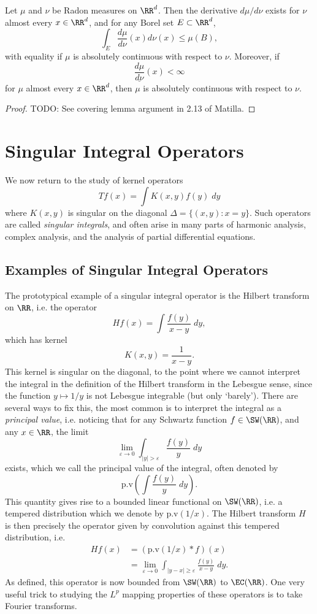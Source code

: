 \begin{theorem}
    Let $\mu$ and $\nu$ be Radon measures on $\RR^d$. Then the derivative $d\mu / d\nu$ exists for $\nu$ almost every $x \in \RR^d$, and for any Borel set $E \subset \RR^d$,
    \[ \int_E \frac{d\mu}{d\nu}(x) d\nu(x) \leq \mu(B), \]
    with equality if $\mu$ is absolutely continuous with respect to $\nu$. Moreover, if
    \[ \underline{\frac{d\mu}{d\nu}}(x) < \infty \]
    for $\mu$ almost every $x \in \RR^d$, then $\mu$ is absolutely continuous with respect to $\nu$.
\end{theorem}
\begin{proof}
    TODO: See covering lemma argument in 2.13 of Matilla.
\end{proof}




\chapter{Singular Integral Operators}

We now return to the study of kernel operators
%
\[ Tf(x) = \int K(x,y) f(y)\; dy \]
%
where $K(x,y)$ is singular on the diagonal $\Delta = \{ (x,y) : x = y \}$. Such operators are called \emph{singular integrals}, and often arise in many parts of harmonic analysis, complex analysis, and the analysis of partial differential equations.

\section{Examples of Singular Integral Operators}

The prototypical example of a singular integral operator is the Hilbert transform on $\RR$, i.e. the operator
%
\[ Hf(x) = \int \frac{f(y)}{x - y}\; dy, \]
%
which has kernel
%
\[ K(x,y) = \frac{1}{x - y}. \]
%
This kernel is singular on the diagonal, to the point where we cannot interpret the integral in the definition of the Hilbert transform in the Lebesgue sense, since the function $y \mapsto 1/y$ is not Lebesgue integrable (but only `barely'). There are several ways to fix this, the most common is to interpret the integral as a \emph{principal value}, i.e. noticing that for any Schwartz function $f \in \SW(\RR)$, and any $x \in \RR$, the limit
%
\[ \lim_{\varepsilon \to 0} \int_{|y| > \varepsilon} \frac{f(y)}{y}\; dy \]
%
exists, which we call the principal value of the integral, often denoted by
%
\[ \text{p.v} \left( \int \frac{f(y)}{y}\; dy \right). \]
%
This quantity gives rise to a bounded linear functional on $\SW(\RR)$, i.e. a tempered distribution which we denote by $\text{p.v}(1/x)$. The Hilbert transform $H$ is then precisely the operator given by convolution against this tempered distribution, i.e.
%
\begin{align*}
    Hf(x) &= (\text{p.v}(1/x) * f)(x)\\
    &= \lim_{\varepsilon \to 0} \int_{|y - x| \geq \varepsilon} \frac{f(y)}{x - y}\; dy.
\end{align*}
%
As defined, this operator is now bounded from $\SW(\RR)$ to $\EC(\RR)$. One very useful trick to studying the $L^p$ mapping properties of these operators is to take Fourier transforms.

